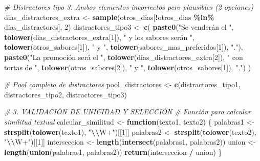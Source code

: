 \documentclass[
]{article}
\newenvironment{Shaded}{\begin{snugshade}}{\end{snugshade}}
\newcommand{\CommentTok}[1]{\textcolor[rgb]{0.56,0.35,0.01}{\textit{#1}}}
\newcommand{\ControlFlowTok}[1]{\textcolor[rgb]{0.13,0.29,0.53}{\textbf{#1}}}
\newcommand{\DecValTok}[1]{\textcolor[rgb]{0.00,0.00,0.81}{#1}}
\newcommand{\FunctionTok}[1]{\textcolor[rgb]{0.13,0.29,0.53}{\textbf{#1}}}
\newcommand{\NormalTok}[1]{#1}
\newcommand{\OtherTok}[1]{\textcolor[rgb]{0.56,0.35,0.01}{#1}}
\newcommand{\SpecialCharTok}[1]{\textcolor[rgb]{0.81,0.36,0.00}{\textbf{#1}}}
\newcommand{\StringTok}[1]{\textcolor[rgb]{0.31,0.60,0.02}{#1}}
\begin{document}
\begin{Shaded}
\begin{Highlighting}[]
  \CommentTok{\# Distractores tipo 3: Ambos elementos incorrectos pero plausibles (2 opciones)}
\NormalTok{  dias\_distractores\_extra }\OtherTok{\textless{}{-}} \FunctionTok{sample}\NormalTok{(otros\_dias[}\SpecialCharTok{!}\NormalTok{otros\_dias }\SpecialCharTok{\%in\%}\NormalTok{ dias\_distractores], }\DecValTok{2}\NormalTok{)}
\NormalTok{  distractores\_tipo3 }\OtherTok{\textless{}{-}} \FunctionTok{c}\NormalTok{(}
    \FunctionTok{paste0}\NormalTok{(}\StringTok{"Se venderán el "}\NormalTok{, }\FunctionTok{tolower}\NormalTok{(dias\_distractores\_extra[}\DecValTok{1}\NormalTok{]),}
           \StringTok{" y los sabores serán "}\NormalTok{, }\FunctionTok{tolower}\NormalTok{(otros\_sabores[}\DecValTok{1}\NormalTok{]),}
           \StringTok{" y "}\NormalTok{, }\FunctionTok{tolower}\NormalTok{(sabores\_mas\_preferidos[}\DecValTok{1}\NormalTok{]), }\StringTok{"."}\NormalTok{),}
    \FunctionTok{paste0}\NormalTok{(}\StringTok{"La promoción será el "}\NormalTok{, }\FunctionTok{tolower}\NormalTok{(dias\_distractores\_extra[}\DecValTok{2}\NormalTok{]),}
           \StringTok{" con tortas de "}\NormalTok{, }\FunctionTok{tolower}\NormalTok{(otros\_sabores[}\DecValTok{2}\NormalTok{]),}
           \StringTok{" y "}\NormalTok{, }\FunctionTok{tolower}\NormalTok{(otros\_sabores[}\DecValTok{1}\NormalTok{]), }\StringTok{"."}\NormalTok{)}
\NormalTok{  )}

  \CommentTok{\# Pool completo de distractores}
\NormalTok{  pool\_distractores }\OtherTok{\textless{}{-}} \FunctionTok{c}\NormalTok{(distractores\_tipo1, distractores\_tipo2, distractores\_tipo3)}

  \CommentTok{\# 3. VALIDACIÓN DE UNICIDAD Y SELECCIÓN}
  \CommentTok{\# Función para calcular similitud textual}
\NormalTok{  calcular\_similitud }\OtherTok{\textless{}{-}} \ControlFlowTok{function}\NormalTok{(texto1, texto2) \{}
\NormalTok{    palabras1 }\OtherTok{\textless{}{-}} \FunctionTok{strsplit}\NormalTok{(}\FunctionTok{tolower}\NormalTok{(texto1), }\StringTok{"}\SpecialCharTok{\textbackslash{}\textbackslash{}}\StringTok{W+"}\NormalTok{)[[}\DecValTok{1}\NormalTok{]]}
\NormalTok{    palabras2 }\OtherTok{\textless{}{-}} \FunctionTok{strsplit}\NormalTok{(}\FunctionTok{tolower}\NormalTok{(texto2), }\StringTok{"}\SpecialCharTok{\textbackslash{}\textbackslash{}}\StringTok{W+"}\NormalTok{)[[}\DecValTok{1}\NormalTok{]]}
\NormalTok{    interseccion }\OtherTok{\textless{}{-}} \FunctionTok{length}\NormalTok{(}\FunctionTok{intersect}\NormalTok{(palabras1, palabras2))}
\NormalTok{    union }\OtherTok{\textless{}{-}} \FunctionTok{length}\NormalTok{(}\FunctionTok{union}\NormalTok{(palabras1, palabras2))}
    \FunctionTok{return}\NormalTok{(interseccion }\SpecialCharTok{/}\NormalTok{ union)}
\NormalTok{  \}}


\end{Highlighting}
\end{Shaded}
\end{document}

